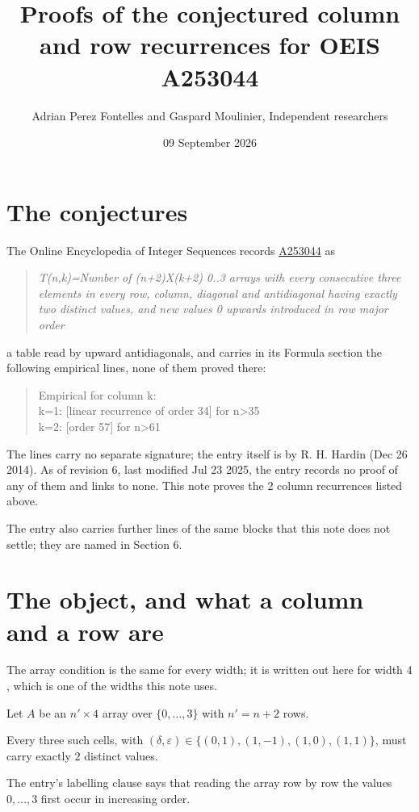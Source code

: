 \documentclass[11pt]{article}
\title{Proofs of the conjectured column and row recurrences for OEIS A253044}
\author{Adrian Perez Fontelles and Gaspard Moulinier, Independent researchers}
\date{09 September 2026}
\theoremstyle{definition}
\begin{document}
\maketitle
\section{The conjectures}

The Online Encyclopedia of Integer Sequences records \href{https://oeis.org/A253044}{A253044} as

\begin{quote}\itshape T(n,k)=Number of (n+2)X(k+2) 0..3 arrays with every consecutive three elements in every row, column, diagonal and antidiagonal having exactly two distinct values, and new values 0 upwards introduced in row major order\end{quote}

a table read by upward antidiagonals, and carries in its Formula section the following empirical lines, none of them proved there:

\begin{quote}\ttfamily Empirical for column k:\\
k=1: [linear recurrence of order 34] for n>35\\k=2: [order 57] for n>61\end{quote}

The lines carry no separate signature; the entry itself is by R. H. Hardin (Dec 26 2014). As of revision 6, last modified Jul 23 2025, the entry records no proof of any of them and links to none. This note proves the 2 column recurrences listed above.

The entry also carries further lines of the same blocks that this note does not settle; they are named in Section 6.

\section{The object, and what a column and a row are}

The array condition is the same for every width; it is written out here for width $4$, which is one of the widths this note uses.

Let $A$ be an $n' \times 4$ array over $\{0,\dots,3\}$ with $n' = n + 2$ rows.

Every three such cells, with $(\delta,\varepsilon) \in \{(0,1), (1,-1), (1,0), (1,1)\}$, must carry exactly $2$ distinct values.

The entry's labelling clause says that reading the array row by row the values $0,\dots,3$ first occur in increasing order.
\end{document}
